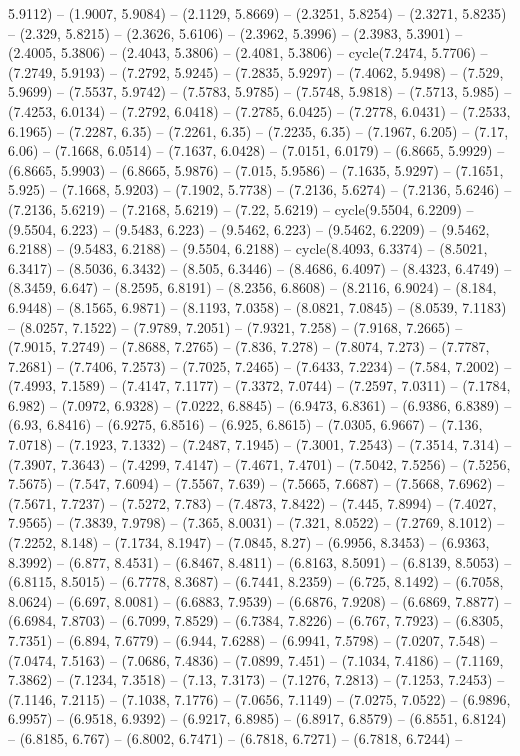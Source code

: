 5.9112) -- (1.9007, 5.9084) -- (2.1129, 5.8669) -- (2.3251, 5.8254) -- (2.3271, 5.8235) -- (2.329, 5.8215) -- (2.3626, 5.6106) -- (2.3962, 5.3996) -- (2.3983, 5.3901) -- (2.4005, 5.3806) -- (2.4043, 5.3806) -- (2.4081, 5.3806) -- cycle(7.2474, 5.7706) -- (7.2749, 5.9193) -- (7.2792, 5.9245) -- (7.2835, 5.9297) -- (7.4062, 5.9498) -- (7.529, 5.9699) -- (7.5537, 5.9742) -- (7.5783, 5.9785) -- (7.5748, 5.9818) -- (7.5713, 5.985) -- (7.4253, 6.0134) -- (7.2792, 6.0418) -- (7.2785, 6.0425) -- (7.2778, 6.0431) -- (7.2533, 6.1965) -- (7.2287, 6.35) -- (7.2261, 6.35) -- (7.2235, 6.35) -- (7.1967, 6.205) -- (7.17, 6.06) -- (7.1668, 6.0514) -- (7.1637, 6.0428) -- (7.0151, 6.0179) -- (6.8665, 5.9929) -- (6.8665, 5.9903) -- (6.8665, 5.9876) -- (7.015, 5.9586) -- (7.1635, 5.9297) -- (7.1651, 5.925) -- (7.1668, 5.9203) -- (7.1902, 5.7738) -- (7.2136, 5.6274) -- (7.2136, 5.6246) -- (7.2136, 5.6219) -- (7.2168, 5.6219) -- (7.22, 5.6219) -- cycle(9.5504, 6.2209) -- (9.5504, 6.223) -- (9.5483, 6.223) -- (9.5462, 6.223) -- (9.5462, 6.2209) -- (9.5462, 6.2188) -- (9.5483, 6.2188) -- (9.5504, 6.2188) -- cycle(8.4093, 6.3374) -- (8.5021, 6.3417) -- (8.5036, 6.3432) -- (8.505, 6.3446) -- (8.4686, 6.4097) -- (8.4323, 6.4749) -- (8.3459, 6.647) -- (8.2595, 6.8191) -- (8.2356, 6.8608) -- (8.2116, 6.9024) -- (8.184, 6.9448) -- (8.1565, 6.9871) -- (8.1193, 7.0358) -- (8.0821, 7.0845) -- (8.0539, 7.1183) -- (8.0257, 7.1522) -- (7.9789, 7.2051) -- (7.9321, 7.258) -- (7.9168, 7.2665) -- (7.9015, 7.2749) -- (7.8688, 7.2765) -- (7.836, 7.278) -- (7.8074, 7.273) -- (7.7787, 7.2681) -- (7.7406, 7.2573) -- (7.7025, 7.2465) -- (7.6433, 7.2234) -- (7.584, 7.2002) -- (7.4993, 7.1589) -- (7.4147, 7.1177) -- (7.3372, 7.0744) -- (7.2597, 7.0311) -- (7.1784, 6.982) -- (7.0972, 6.9328) -- (7.0222, 6.8845) -- (6.9473, 6.8361) -- (6.9386, 6.8389) -- (6.93, 6.8416) -- (6.9275, 6.8516) -- (6.925, 6.8615) -- (7.0305, 6.9667) -- (7.136, 7.0718) -- (7.1923, 7.1332) -- (7.2487, 7.1945) -- (7.3001, 7.2543) -- (7.3514, 7.314) -- (7.3907, 7.3643) -- (7.4299, 7.4147) -- (7.4671, 7.4701) -- (7.5042, 7.5256) -- (7.5256, 7.5675) -- (7.547, 7.6094) -- (7.5567, 7.639) -- (7.5665, 7.6687) -- (7.5668, 7.6962) -- (7.5671, 7.7237) -- (7.5272, 7.783) -- (7.4873, 7.8422) -- (7.445, 7.8994) -- (7.4027, 7.9565) -- (7.3839, 7.9798) -- (7.365, 8.0031) -- (7.321, 8.0522) -- (7.2769, 8.1012) -- (7.2252, 8.148) -- (7.1734, 8.1947) -- (7.0845, 8.27) -- (6.9956, 8.3453) -- (6.9363, 8.3992) -- (6.877, 8.4531) -- (6.8467, 8.4811) -- (6.8163, 8.5091) -- (6.8139, 8.5053) -- (6.8115, 8.5015) -- (6.7778, 8.3687) -- (6.7441, 8.2359) -- (6.725, 8.1492) -- (6.7058, 8.0624) -- (6.697, 8.0081) -- (6.6883, 7.9539) -- (6.6876, 7.9208) -- (6.6869, 7.8877) -- (6.6984, 7.8703) -- (6.7099, 7.8529) -- (6.7384, 7.8226) -- (6.767, 7.7923) -- (6.8305, 7.7351) -- (6.894, 7.6779) -- (6.944, 7.6288) -- (6.9941, 7.5798) -- (7.0207, 7.548) -- (7.0474, 7.5163) -- (7.0686, 7.4836) -- (7.0899, 7.451) -- (7.1034, 7.4186) -- (7.1169, 7.3862) -- (7.1234, 7.3518) -- (7.13, 7.3173) -- (7.1276, 7.2813) -- (7.1253, 7.2453) -- (7.1146, 7.2115) -- (7.1038, 7.1776) -- (7.0656, 7.1149) -- (7.0275, 7.0522) -- (6.9896, 6.9957) -- (6.9518, 6.9392) -- (6.9217, 6.8985) -- (6.8917, 6.8579) -- (6.8551, 6.8124) -- (6.8185, 6.767) -- (6.8002, 6.7471) -- (6.7818, 6.7271) -- (6.7818, 6.7244) -- 